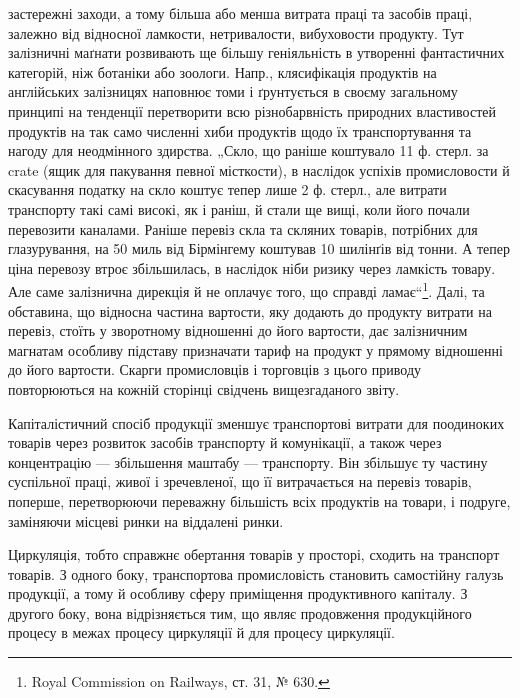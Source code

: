 \parcont{}  %
застережні заходи, а тому більша або менша витрата праці та засобів
праці, залежно від відносної ламкости, нетривалости, вибуховости продукту.
Тут залізничні маґнати розвивають ще більшу геніяльність в утворенні
фантастичних категорій, ніж ботаніки або зоологи. Напр., клясифікація
продуктів на англійських залізницях наповнює томи і ґрунтується
в своєму загальному принципі на тенденції перетворити всю різнобарвність
природних властивостей продуктів на так само численні хиби продуктів
щодо їх транспортування та нагоду для неодмінного здирства.
„Скло, що раніше коштувало 11 ф. стерл. за crate (ящик для пакування
певної місткости), в наслідок успіхів промисловости й скасування податку
на скло коштує тепер лише 2 ф. стерл., але витрати транспорту такі самі
високі, як і раніш, й стали ще вищі, коли його почали перевозити каналами.
Раніше перевіз скла та скляних товарів, потрібних для глазурування,
на 50 миль від Бірмінгему коштував 10 шилінґів від тонни. А
тепер ціна перевозу втроє збільшилась, в наслідок ніби ризику через
ламкість товару. Але саме залізнична дирекція й не оплачує того, що
справді ламає“\footnote{
Royal Commission on Railways, ст. 31, № 630.
}. Далі, та обставина, що відносна частина вартости, яку
додають до продукту витрати на перевіз, стоїть у зворотному відношенні
до його вартости, дає залізничним магнатам особливу підставу призначати
тариф на продукт у прямому відношенні до його вартости. Скарги промисловців
і торговців з цього приводу повторюються на кожній сторінці
свідчень вищезгаданого звіту.

Капіталістичний спосіб продукції зменшує транспортові витрати для
поодиноких товарів через розвиток засобів транспорту й комунікації, а
також через концентрацію — збільшення маштабу — транспорту. Він збільшує
ту частину суспільної праці, живої і зречевленої, що її витрачається
на перевіз товарів, поперше, перетворюючи переважну більшість всіх
продуктів на товари, і подруге, заміняючи місцеві ринки на віддалені
ринки.

Циркуляція, тобто справжнє обертання товарів у просторі, сходить на
транспорт товарів. З одного боку, транспортова промисловість становить
самостійну галузь продукції, а тому й особливу сферу приміщення продуктивного
капіталу. З другого боку, вона відрізняється тим, що являє
продовження продукційного процесу в межах процесу циркуляції й
для процесу циркуляції.
